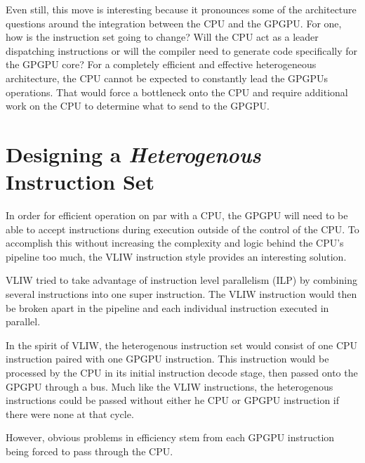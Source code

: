 Even still, this move is interesting because it pronounces some of the architecture questions around the integration between the CPU and the GPGPU. For one, how is the instruction set going to change? Will the CPU act as a leader dispatching instructions or will the compiler need to generate code specifically for the GPGPU core? For a completely efficient and effective heterogeneous architecture, the CPU cannot be expected to constantly lead the GPGPUs operations. That would force a bottleneck onto the CPU and require additional work on the CPU to determine what to send to the GPGPU. 


\section*{Designing a \textit{Heterogenous} Instruction Set}

In order for efficient operation on par with a CPU, the GPGPU will need to be able to accept instructions during execution outside of the control of the CPU. To accomplish this without increasing the complexity and logic behind the CPU's pipeline too much, the VLIW instruction style provides an interesting solution. 

VLIW tried to take advantage of instruction level parallelism (ILP) by combining several instructions into one super instruction. The VLIW instruction would then be broken apart in the pipeline and each individual instruction executed in parallel. 

In the spirit of VLIW, the heterogenous instruction set would consist of one CPU instruction paired with one GPGPU instruction. This instruction would be processed by the CPU in its initial instruction decode stage, then passed onto the GPGPU through a bus. Much like the VLIW instructions, the heterogenous instructions could be passed without either he CPU or GPGPU instruction if there were none at that cycle. 

However, obvious problems in efficiency stem from each GPGPU instruction being forced to pass through the CPU. 












